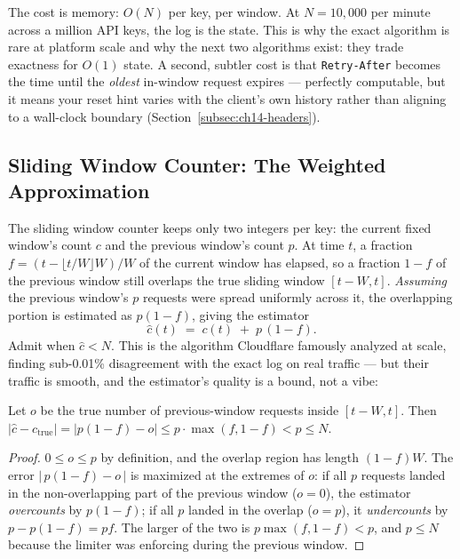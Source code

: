The cost is memory: $O(N)$ per key, per window. At $N = 10{,}000$ per
minute across a million API keys, the log is the state. This is why the
exact algorithm is rare at platform scale and why the next two algorithms
exist: they trade exactness for $O(1)$ state. A second, subtler cost is
that \texttt{Retry-After} becomes the time until the \emph{oldest} in-window
request expires --- perfectly computable, but it means your reset hint
varies with the client's own history rather than aligning to a wall-clock
boundary (Section~\ref{subsec:ch14-headers}).

\subsection{Sliding Window Counter: The Weighted Approximation}
\label{subsec:ch14-sliding-counter}

The sliding window counter keeps only two integers per key: the current
fixed window's count $c$ and the previous window's count $p$. At time $t$,
a fraction $f = (t - \lfloor t/W \rfloor W)/W$ of the current window has
elapsed, so a fraction $1-f$ of the previous window still overlaps the
true sliding window $[t-W, t]$. \emph{Assuming} the previous window's $p$
requests were spread uniformly across it, the overlapping portion is
estimated as $p(1-f)$, giving the estimator
\begin{equation}
  \hat{c}(t) \;=\; c(t) \;+\; p\,(1-f).
  \label{eq:ch14-swc}
\end{equation}
Admit when $\hat{c} < N$. This is the algorithm Cloudflare famously
analyzed at scale, finding sub-0.01\% disagreement with the exact log on
real traffic --- but their traffic is smooth, and the estimator's quality
is a bound, not a vibe:

\begin{proposition}
\label{prop:ch14-swc-error}
Let $o$ be the true number of previous-window requests inside $[t-W, t]$.
Then $|\hat{c} - c_{\mathrm{true}}| = |p(1-f) - o| \le p \cdot \max(f, 1-f)
< p \le N$.
\end{proposition}

\begin{proof}
$0 \le o \le p$ by definition, and the overlap region has length $(1-f)W$.
The error $|\,p(1-f) - o\,|$ is maximized at the extremes of $o$: if all
$p$ requests landed in the non-overlapping part of the previous window
($o=0$), the estimator \emph{overcounts} by $p(1-f)$; if all $p$ landed in
the overlap ($o=p$), it \emph{undercounts} by $p - p(1-f) = pf$. The larger
of the two is $p\max(f, 1-f) < p$, and $p \le N$ because the limiter was
enforcing during the previous window.
\end{proof}


